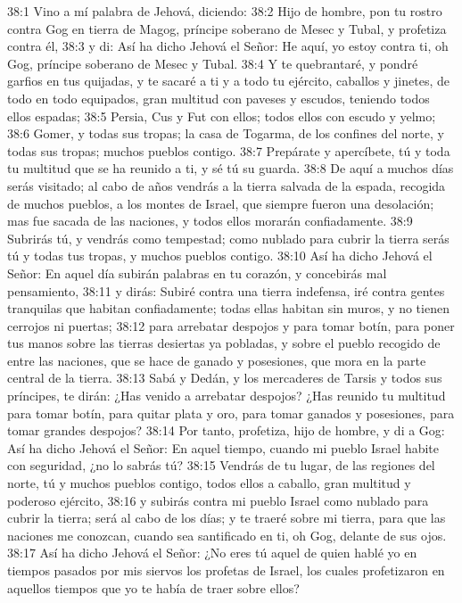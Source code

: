 38:1 Vino a mí palabra de Jehová, diciendo:   
38:2 Hijo de hombre, pon tu rostro contra Gog en tierra de Magog, príncipe soberano de Mesec y Tubal, y profetiza contra él,   
38:3 y di: Así ha dicho Jehová el Señor: He aquí, yo estoy contra ti, oh Gog, príncipe soberano de Mesec y Tubal.   
38:4 Y te quebrantaré, y pondré garfios en tus quijadas, y te sacaré a ti y a todo tu ejército, caballos y jinetes, de todo en todo equipados, gran multitud con paveses y escudos, teniendo todos ellos espadas;   
38:5 Persia, Cus y Fut con ellos; todos ellos con escudo y yelmo;   
38:6 Gomer, y todas sus tropas; la casa de Togarma, de los confines del norte, y todas sus tropas; muchos pueblos contigo.   
38:7 Prepárate y apercíbete, tú y toda tu multitud que se ha reunido a ti, y sé tú su guarda.   
38:8 De aquí a muchos días serás visitado; al cabo de años vendrás a la tierra salvada de la espada, recogida de muchos pueblos, a los montes de Israel, que siempre fueron una desolación; mas fue sacada de las naciones, y todos ellos morarán confiadamente.   
38:9 Subrirás tú, y vendrás como tempestad; como nublado para cubrir la tierra serás tú y todas tus tropas, y muchos pueblos contigo.   
38:10 Así ha dicho Jehová el Señor: En aquel día subirán palabras en tu corazón, y concebirás mal pensamiento,   
38:11 y dirás: Subiré contra una tierra indefensa, iré contra gentes tranquilas que habitan confiadamente; todas ellas habitan sin muros, y no tienen cerrojos ni puertas;   
38:12 para arrebatar despojos y para tomar botín, para poner tus manos sobre las tierras desiertas ya pobladas, y sobre el pueblo recogido de entre las naciones, que se hace de ganado y posesiones, que mora en la parte central de la tierra.   
38:13 Sabá y Dedán, y los mercaderes de Tarsis y todos sus príncipes, te dirán: ¿Has venido a arrebatar despojos? ¿Has reunido tu multitud para tomar botín, para quitar plata y oro, para tomar ganados y posesiones, para tomar grandes despojos?   
38:14 Por tanto, profetiza, hijo de hombre, y di a Gog: Así ha dicho Jehová el Señor: En aquel tiempo, cuando mi pueblo Israel habite con seguridad, ¿no lo sabrás tú?   
38:15 Vendrás de tu lugar, de las regiones del norte, tú y muchos pueblos contigo, todos ellos a caballo, gran multitud y poderoso ejército,   
38:16 y subirás contra mi pueblo Israel como nublado para cubrir la tierra; será al cabo de los días; y te traeré sobre mi tierra, para que las naciones me conozcan, cuando sea santificado en ti, oh Gog, delante de sus ojos.   
38:17 Así ha dicho Jehová el Señor: ¿No eres tú aquel de quien hablé yo en tiempos pasados por mis siervos los profetas de Israel, los cuales profetizaron en aquellos tiempos que yo te había de traer sobre ellos?   
